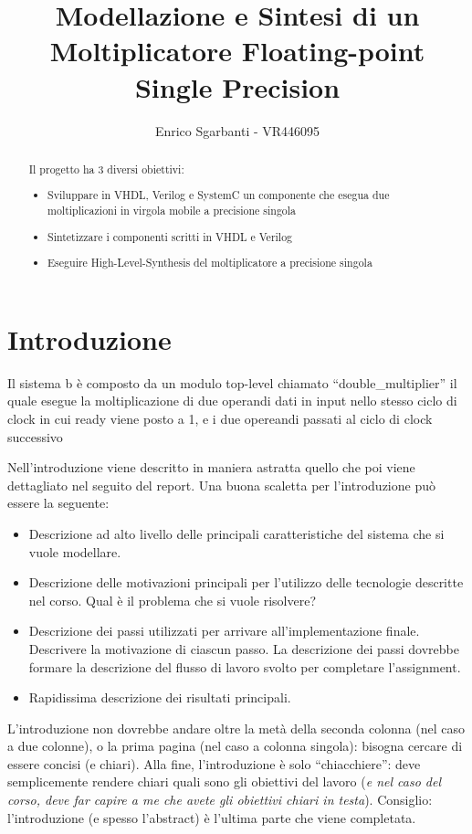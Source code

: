 \documentclass[]{IEEEtran}
\title{Modellazione e Sintesi di un Moltiplicatore Floating-point Single Precision}
\author{Enrico Sgarbanti - VR446095}
\begin{document}
\maketitle

\begin{abstract}
Il progetto ha 3 diversi obiettivi:
\begin{itemize}
\item Sviluppare in VHDL, Verilog e SystemC un componente che esegua due moltiplicazioni in virgola mobile a precisione singola
\item Sintetizzare i componenti scritti in VHDL e Verilog
\item Eseguire High-Level-Synthesis del moltiplicatore a precisione singola
\end{itemize}
\end{abstract}


\section{Introduzione}
Il sistema b è composto da un modulo top-level chiamato ``double\_multiplier'' il quale esegue la moltiplicazione di due operandi dati in input nello stesso ciclo di clock in cui ready viene posto a 1, e i due opereandi passati al ciclo di clock successivo


Nell'introduzione viene descritto in maniera astratta quello che poi viene dettagliato nel seguito del report. Una buona scaletta per l'introduzione può essere la seguente:
\begin{itemize}
\item Descrizione ad alto livello delle principali caratteristiche del sistema che si vuole modellare.
\item Descrizione delle motivazioni principali per l'utilizzo delle tecnologie descritte nel corso. Qual è il problema che si vuole risolvere?
\item Descrizione dei passi utilizzati per arrivare all'implementazione finale. Descrivere la motivazione di ciascun passo. La descrizione dei passi dovrebbe formare la descrizione del flusso di lavoro svolto per completare l'assignment.
\item Rapidissima descrizione dei risultati principali.
\end{itemize}

L'introduzione non dovrebbe andare oltre la metà della seconda colonna (nel caso a due colonne), o la prima pagina (nel caso a colonna singola): bisogna cercare di essere concisi (e chiari). Alla fine, l'introduzione è solo ``chiacchiere'': deve semplicemente rendere chiari quali sono gli obiettivi del lavoro (\emph{e nel caso del corso, deve far capire a me che avete gli obiettivi chiari in testa}). Consiglio: l'introduzione (e spesso l'abstract) è l'ultima parte che viene completata.
\end{document}

